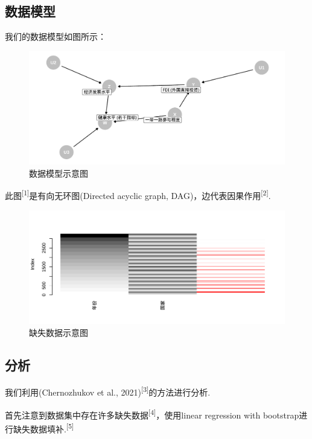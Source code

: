 \documentclass[]{ctexart}
\begin{document}
\hypertarget{ux6570ux636eux6a21ux578b}{%
\subsection{数据模型}\label{ux6570ux636eux6a21ux578b}}

我们的数据模型如图所示：

\begin{figure}

{\centering \includegraphics[width=0.65\linewidth,height=0.6\textheight]{resources/DAG} 

}

\caption{数据模型示意图}\label{fig:unnamed-chunk-3}
\end{figure}

此图\textsuperscript{{[}1{]}}是有向无环图(Directed acyclic graph,
DAG)，边代表因果作用\textsuperscript{{[}2{]}}.

\begin{figure}

{\centering \includegraphics[width=0.65\linewidth,height=0.6\textheight]{resources/Missing data} 

}

\caption{缺失数据示意图}\label{fig:unnamed-chunk-4}
\end{figure}

\hypertarget{ux5206ux6790}{%
\subsection{分析}\label{ux5206ux6790}}

我们利用(Chernozhukov et al.,
2021)\textsuperscript{{[}3{]}}的方法进行分析.

首先注意到数据集中存在许多缺失数据\textsuperscript{{[}4{]}}，使用linear
regression with bootstrap进行缺失数据填补.\textsuperscript{{[}5{]}}
\end{document}

